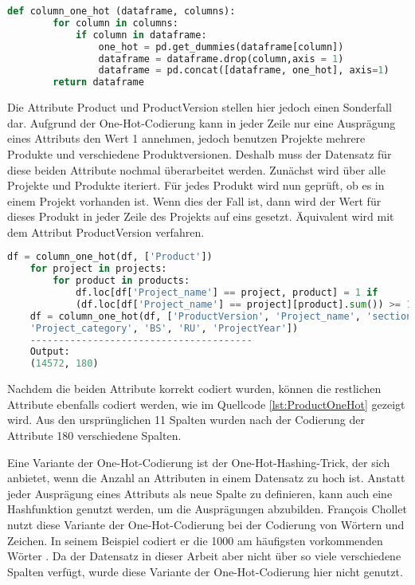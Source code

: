 \begin{lstlisting}[language = python, caption={Funktion zur One-Hot-Codierung},captionpos=b, label = lst:OneHot, floatplacement=H]
    def column_one_hot (dataframe, columns): 
        for column in columns:
            if column in dataframe:
                one_hot = pd.get_dummies(dataframe[column])
                dataframe = dataframe.drop(column,axis = 1)
                dataframe = pd.concat([dataframe, one_hot], axis=1)
        return dataframe
\end{lstlisting}

Die Attribute \glqq Product\grqq{} und \glqq ProductVersion\grqq{} stellen hier jedoch einen Sonderfall dar. Aufgrund der One-Hot-Codierung kann in jeder Zeile nur eine Ausprägung
eines Attributs den Wert 1 annehmen, jedoch benutzen Projekte mehrere Produkte und verschiedene Produktversionen. Deshalb muss der Datensatz für diese beiden Attribute nochmal 
überarbeitet werden. Zunächst wird über alle Projekte und Produkte iteriert. Für jedes Produkt wird nun geprüft, ob es in einem Projekt vorhanden ist. Wenn dies der Fall ist,
dann wird der Wert für dieses Produkt in jeder Zeile des Projekts auf eins gesetzt. Äquivalent wird mit dem Attribut \glqq ProductVersion\grqq{} verfahren. 

\begin{lstlisting}[language = python, caption={Anpassung der Spalte \glqq Product\grqq},captionpos=b, label = lst:ProductOneHot, floatplacement=H]
    df = column_one_hot(df, ['Product'])
    for project in projects:
        for product in products:
            df.loc[df['Project_name'] == project, product] = 1 if 
            (df.loc[df['Project_name'] == project][product].sum()) >= 1 else 0
    df = column_one_hot(df, ['ProductVersion', 'Project_name', 'section',
    'Project_category', 'BS', 'RU', 'ProjectYear'])
    ---------------------------------------
    Output:
    (14572, 180)
\end{lstlisting}

Nachdem die beiden Attribute korrekt codiert wurden, können die restlichen Attribute ebenfalls codiert werden, wie im Quellcode \ref*{lst:ProductOneHot} gezeigt wird.
Aus den ursprünglichen 11 Spalten wurden nach der Codierung der Attribute 180 verschiedene Spalten.

Eine Variante der One-Hot-Codierung ist der One-Hot-Hashing-Trick, der sich anbietet, wenn die Anzahl an Attributen in einem Datensatz zu hoch ist. Anstatt jeder Ausprägung
eines Attributs als neue Spalte zu definieren, kann auch eine Hashfunktion genutzt werden, um die Ausprägungen abzubilden. François Chollet nutzt diese Variante
der One-Hot-Codierung bei der Codierung von Wörtern und Zeichen. In seinem Beispiel codiert er die 1000 am häufigsten vorkommenden Wörter \cite[vgl. S.236]{DL_PY}. Da der Datensatz in dieser Arbeit aber 
nicht über so viele verschiedene Spalten verfügt, wurde diese Variante der One-Hot-Codierung hier nicht genutzt.

